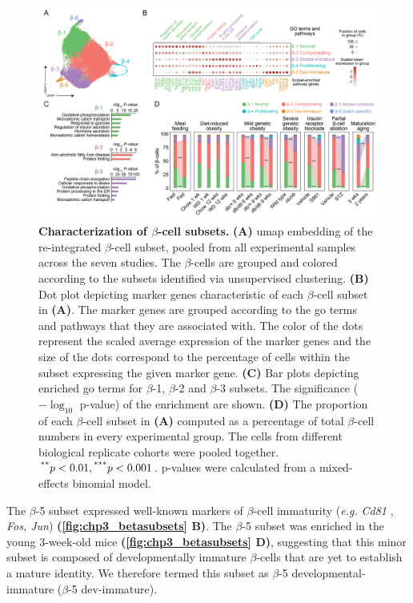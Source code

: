 \begin{figure}[t]
\centering
\includegraphics[width=\linewidth]{Chapter5/Fig/F3-1-v2-03.png}
\caption[Characterization of $\beta$-cell subsets]{\textbf{Characterization of $\beta$-cell subsets.} \textbf{(A)} \gls{umap} embedding of the re-integrated $\beta$-cell subset, pooled from all experimental samples across the seven studies. The $\beta$-cells are grouped and colored according to the subsets identified via unsupervised clustering. \textbf{(B)} Dot plot depicting marker genes characteristic of each $\beta$-cell subset in \textbf{(A)}. The marker genes are grouped according to the \gls{go} terms and pathways that they are associated with. The color of the dots represent the scaled average expression of the marker genes and the size of the dots correspond to the percentage of cells within the subset expressing the given marker gene. \textbf{(C)} Bar plots depicting enriched \gls{go} terms for $\beta$-1, $\beta$-2 and $\beta$-3 subsets. The significance ($-\log_{10}$ p-value) of the enrichment are shown. \textbf{(D)} The proportion of each $\beta$-cell subset in \textbf{(A)} computed as a percentage of total $\beta$-cell numbers in every experimental group. The cells from different biological replicate cohorts were pooled together. $\textsuperscript{**} p < 0.01, \textsuperscript{***} p < 0.001$. p-values were calculated from a mixed-effects binomial model.}
\label{fig:chp3_betasubsets}
\end{figure}

\par The $\beta$-5 subset expressed well-known markers of $\beta$-cell immaturity (\textit{e.g.} \textit{Cd81} \textbf{\cite{salinno_cd81_2021}}, \textit{Fos, Jun}) \textbf{(\autoref{fig:chp3_betasubsets} B)}. The $\beta$-5 subset was enriched in the young 3-week-old mice \textbf{(\autoref{fig:chp3_betasubsets} D)}, suggesting that this minor subset is composed of developmentally immature $\beta$-cells that are yet to establish a mature identity. We therefore termed this subset as $\beta$-5 developmental-immature ($\beta$-5 dev-immature).\\


